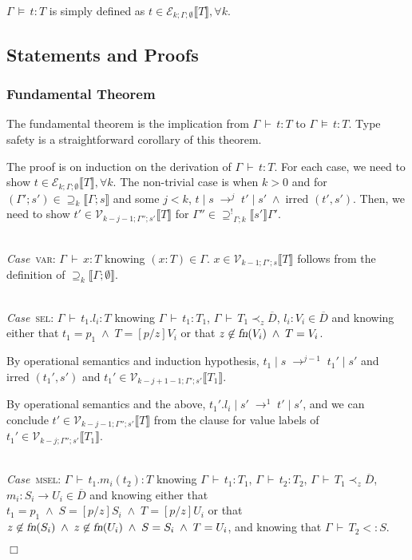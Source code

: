 \documentclass[9pt]{sigplanconf}
\newenvironment{myproof}{{\em Proof:}}{$\Box$}
\newcommand{\Case}{{\em Case\ }}
\newcommand{\ts}{\,\vdash\,}
\newcommand{\fn}{\mbox{\sl fn}}
\newcommand{\expand}{\prec}
\newcommand{\sub}{<:}
\newcommand{\tfun}{\rightarrow}
\newcommand{\seq}[1]{\overline{#1}}
\newcommand{\subst}[3]{[#1/#2]#3}
\newcommand{\ldecl}[2]{#1 : #2}
\newcommand{\mdecl}[3]{#1 : #2 \tfun #3}
\newcommand{\relv}[4]{\mathcal{V}_{#1;#2;#3}\llbracket#4\rrbracket}
\newcommand{\rele}[4]{\mathcal{E}_{#1;#2;#3}\llbracket#4\rrbracket}
\newcommand{\rels}[3]{\mathcal{\supseteq}_{#1}\llbracket#2;#3\rrbracket}
\newcommand{\relg}[3]{\mathcal{\supseteq^!}_{#1;#2}\llbracket#3\rrbracket}
\newcommand{\irred}[2]{\text{irred }(#1,#2)}
\newcommand{\andl}{\;\wedge\;}
\newcommand{\reductionl}[5]{#1 \operatorname{|} #2 \;\rightarrow^{#5}\; #3 \operatorname{|} #4}
\newcommand{\ds}{\,\vDash\,}
\begin{document}
$\Gamma \ds t : T$ is simply defined as $t \in \rele k \Gamma \emptyset T,
\forall k$.

\subsection{Statements and Proofs}

\subsubsection{Fundamental Theorem}

The fundamental theorem is the implication from $\Gamma \ts t : T$ to
$\Gamma \ds t : T$. Type safety is a straightforward corollary of this
theorem.

\begin{myproof}
The proof is on induction on the derivation of $\Gamma \ts t : T$. For
each case, we need to show $t \in \rele k \Gamma \emptyset T, \forall
k$. The non-trivial case is when $k > 0$ and for $(\Gamma'; s') \in
\rels k \Gamma s$ and some $j < k$, $\reductionl {t} s {t'} {s'} j
\andl \irred {t'} {s'}$. Then, we need to show ${t'} \in \relv {k-j-1}
      {\Gamma''} {s'} T$ for ${\Gamma''} \in \relg \Gamma k {s'}
      {\Gamma'}$.

\ \\

\Case \textsc{var}: $\Gamma \ts x : T$ knowing $(x : T) \in
\Gamma$. $x \in \relv {k-1} {\Gamma'} s T$ follows from the definition of
$\rels k \Gamma \emptyset$.

\ \\

\Case \textsc{sel}: $\Gamma \ts t_1.l_i : T$ knowing $\Gamma \ts t_1 :
T_1$, $\Gamma \ts T_1 \expand_z \seq{D}$, $\ldecl {l_i} {V_i} \in
\seq{D}$ and knowing either that $t_1 = p_1 \andl T = \subst p z
    {V_i}$ or that $z \not\in \fn(V_i) \andl T = V_i$.

By operational semantics and induction hypothesis, $\reductionl {t_1}
s {t_1'} {s'} {j-1}$ and $\irred {t_1'} {s'}$ and ${t_1'} \in \relv
{k-j+1-1} {\Gamma'} {s'} {T_1}$.

By operational semantics and the above, $\reductionl {t_1'.l_i} {s'}
{t'} {s'} 1$, and we can conclude $t' \in \relv {k-j-1} {\Gamma''} {s'}
T$ from the clause for value labels of ${t_1'} \in \relv {k-j}
{\Gamma''} {s'} {T_1}$.

\ \\

\Case \textsc{msel}: $\Gamma \ts t_1.m_i(t_2) : T$ knowing $\Gamma \ts
t_1 : T_1$, $\Gamma \ts t_2 : T_2$, $\Gamma \ts T_1 \expand_z
\seq{D}$, $\mdecl {m_i} {S_i} {U_i} \in \seq{D}$ and knowing either
that $t_1 = p_1 \andl S = \subst p z {S_i} \andl T = \subst p z {U_i}$
or that $z \not\in \fn(S_i) \andl z \not\in \fn(U_i) \andl S = S_i \andl
T = U_i$, and knowing that $\Gamma \ts T_2 \sub S$.


\end{myproof}
\end{document}
